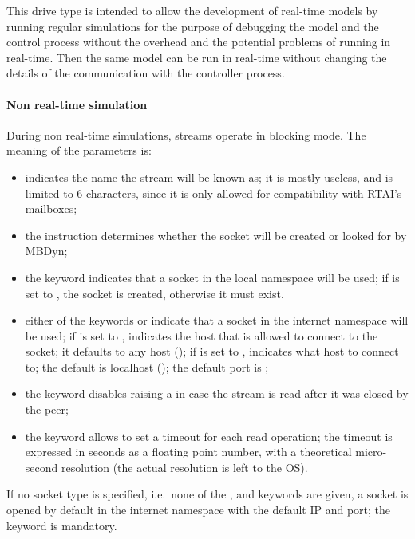This drive type is intended to allow the development of real-time models
by running regular simulations for the purpose of debugging the model
and the control process without the overhead and the potential problems
of running in real-time.
Then the same model can be run in real-time without changing the details
of the communication with the controller process.

\paragraph{Non real-time simulation}
During non real-time simulations, streams operate in blocking mode.
The meaning of the parameters is:
\begin{itemize}
\item {} indicates the name the stream will be known as;
it is mostly useless, and is limited to 6 characters,
since it is only allowed for compatibility with RTAI's mailboxes;
\item the instruction  determines whether the socket will be
created or looked for by MBDyn;
\item the keyword  indicates that a socket 
in the local namespace will be used; if  is set to ,
the socket is created, otherwise it must exist.
\item either of the keywords  or  indicate that a socket
in the internet namespace will be used;
if  is set to ,  indicates 
the host that is allowed to connect to the socket; it defaults 
to any host (); if  is set to ,
 indicates what host to connect to; the default 
is localhost (); the default port is ;
\item the keyword  disables raising a 
in case the stream is read after it was closed by the peer;
\item the keyword  allows to set a timeout
for each read operation; the timeout is expressed in seconds
as a floating point number, with a theoretical micro-second resolution
(the actual resolution is left to the OS).
\end{itemize}
If no socket type is specified, i.e.\ none of the ,  
and  keywords are given, a socket is opened by default 
in the internet namespace with the default IP and port; the 
keyword is mandatory.

